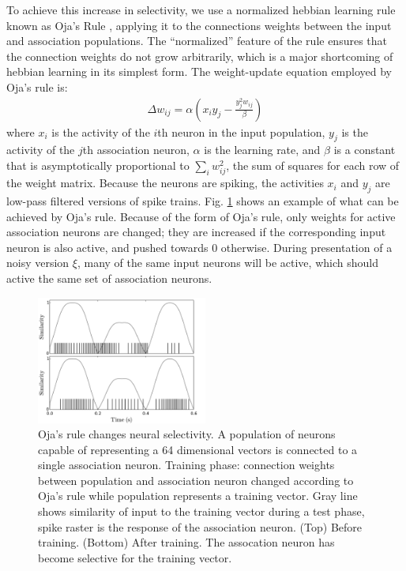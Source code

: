 \documentclass[10pt,letterpaper]{article}
\begin{document}
To achieve this increase in selectivity, we use a normalized hebbian learning rule known as Oja's Rule \citep{oja}, applying it to the connections weights between the input and association populations. The ``normalized'' feature of the rule ensures that the connection weights do not grow arbitrarily, which is a major shortcoming of hebbian learning in its simplest form. The weight-update equation employed by Oja's rule is:
\begin{align}
  \Delta w_{ij} = \alpha (x_i y_j - \frac{y_j^2 w_{ij}}{\beta})
\end{align}
where $x_i$ is the activity of the $i$th neuron in the input population, $y_j$ is the activity of the $j$th association neuron, $\alpha$ is the learning rate, and $\beta$ is a constant that is asymptotically proportional to $\sum_i w_{ij}^2$, the sum of squares for each row of the weight matrix. Because the neurons are spiking, the activities $x_i$ and $y_j$ are low-pass filtered versions of spike trains. Fig. \ref{fig:oja} shows an example of what can be achieved by Oja's rule. Because of the form of Oja's rule, only weights for active association neurons are changed; they are increased if the corresponding input neuron is also active, and pushed towards 0 otherwise. During presentation of a noisy version $\xi$, many of the same input neurons will be active, which should active the same set of association neurons.
\begin{figure}[ht]
\begin{center}
\includegraphics[width=0.5\textwidth]{../default_plots/oja_plot_D_64.pdf}
\end{center}
\caption{Oja's rule changes neural selectivity. A population of neurons capable of representing a 64 dimensional vectors is connected to a single association neuron. Training phase: connection weights between population and association neuron changed according to Oja's rule while population represents a training vector. Gray line shows similarity of input to the training vector during a test phase, spike raster is the response of the association neuron. (Top) Before training. (Bottom) After training. The assocation neuron has become selective for the training vector.}
\label{fig:oja}
\end{figure}
\end{document}
